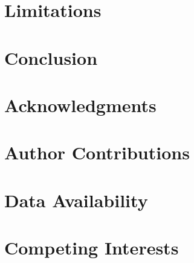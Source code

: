 \documentclass[12pt]{article}
\begin{document}
\section{Limitations}

\section{Conclusion}

\section*{Acknowledgments}

\section*{Author Contributions}

\section*{Data Availability}

\section*{Competing Interests}


\end{document}

